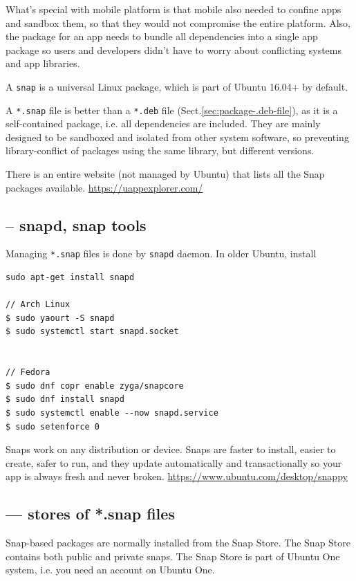 What's special with mobile platform is that mobile also needed to confine apps
and sandbox them, so that they would not compromise the entire platform. Also,
the package for an app needs to bundle all dependencies into a single app
package so users and developers didn’t have to worry about conflicting systems
and app libraries. 


A \verb!snap! is a universal Linux package, which is part of Ubuntu 16.04+ by
default.  



A \verb!*.snap! file is better than a \verb!*.deb! file
(Sect.\ref{sec:package-.deb-file}), as it is a self-contained package, i.e. all
dependencies are included. They are mainly designed to be sandboxed and isolated
from other system software, so preventing library-conflict of packages using the
same library, but different versions.

There is an entire website (not managed by Ubuntu) that lists all the Snap
packages available. \url{https://uappexplorer.com/}


\subsection{-- snapd, snap tools}
\label{sec:snapd-tools}

Managing \verb!*.snap! files is done by \verb!snapd! daemon. In older Ubuntu,
install
\begin{verbatim}
sudo apt-get install snapd

// Arch Linux
$ sudo yaourt -S snapd
$ sudo systemctl start snapd.socket


// Fedora
$ sudo dnf copr enable zyga/snapcore
$ sudo dnf install snapd
$ sudo systemctl enable --now snapd.service
$ sudo setenforce 0
\end{verbatim}


Snaps work on any distribution or device. Snaps are faster to install, easier to
create, safer to run, and they update automatically and transactionally so your
app is always fresh and never broken.
\url{https://www.ubuntu.com/desktop/snappy}

\subsection{--- stores of *.snap files}

Snap-based packages are normally installed from the Snap Store.
The Snap Store contains both public and private snaps. The Snap Store is part of Ubuntu One system, i.e.
you need an account on Ubuntu One.

